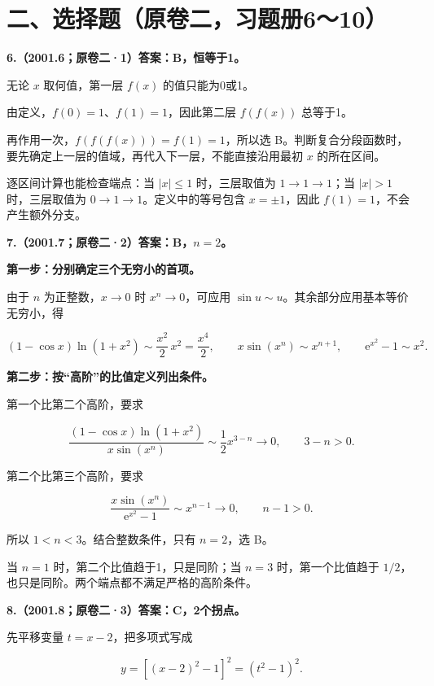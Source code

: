 \documentclass[UTF8,11pt,fontset=windows]{ctexart}
\begin{document}
\clearpage

\section*{二、选择题（原卷二，习题册6～10）}

\textbf{6.（2001.6；原卷二·1）答案：B，恒等于1。}

无论 $x$ 取何值，第一层 $f(x)$ 的值只能为0或1。

由定义，$f(0)=1$、$f(1)=1$，因此第二层 $f(f(x))$ 总等于1。

再作用一次，$f(f(f(x)))=f(1)=1$，所以选 B。判断复合分段函数时，要先确定上一层的值域，再代入下一层，不能直接沿用最初 $x$ 的所在区间。

逐区间计算也能检查端点：当 $|x|\le1$ 时，三层取值为 $1\to1\to1$；当 $|x|>1$ 时，三层取值为 $0\to1\to1$。定义中的等号包含 $x=\pm1$，因此 $f(1)=1$，不会产生额外分支。

\clearpage

\textbf{7.（2001.7；原卷二·2）答案：B，$n=2$。}

\textbf{第一步：分别确定三个无穷小的首项。}

由于 $n$ 为正整数，$x\to0$ 时 $x^n\to0$，可应用 $\sin u\sim u$。其余部分应用基本等价无穷小，得

$$
(1-\cos x)\ln(1+x^2)\sim\frac{x^2}{2}\,x^2=\frac{x^4}{2},
\qquad x\sin(x^n)\sim x^{n+1},
\qquad \mathrm e^{x^2}-1\sim x^2.
$$

\textbf{第二步：按“高阶”的比值定义列出条件。}

第一个比第二个高阶，要求

$$
\frac{(1-\cos x)\ln(1+x^2)}{x\sin(x^n)}
\sim\frac12x^{3-n}\longrightarrow0,
\qquad 3-n>0.
$$

第二个比第三个高阶，要求

$$
\frac{x\sin(x^n)}{\mathrm e^{x^2}-1}
\sim x^{n-1}\longrightarrow0,
\qquad n-1>0.
$$

所以 $1<n<3$。结合整数条件，只有 $\boxed{n=2}$，选 B。

当 $n=1$ 时，第二个比值趋于1，只是同阶；当 $n=3$ 时，第一个比值趋于 $1/2$，也只是同阶。两个端点都不满足严格的高阶条件。

\clearpage

\textbf{8.（2001.8；原卷二·3）答案：C，2个拐点。}

先平移变量 $t=x-2$，把多项式写成

$$
y=[(x-2)^2-1]^2=(t^2-1)^2.
$$
\end{document}
